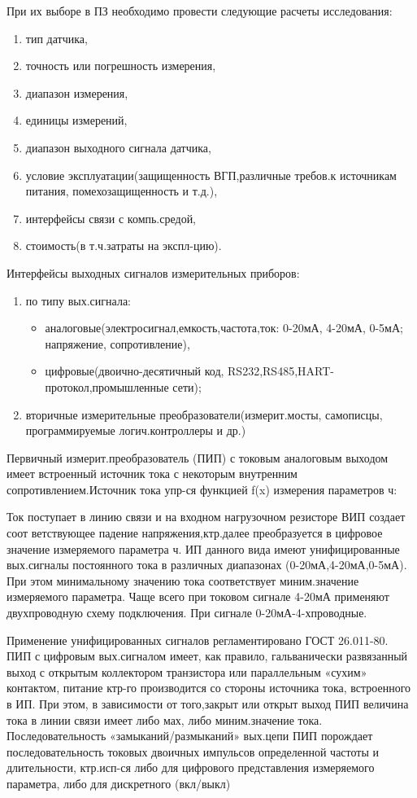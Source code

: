 \documentclass[unicode, 12pt, a4paper, oneside]{article}
\begin{document}
При их выборе в ПЗ необходимо провести следующие расчеты исследования:
\begin{enumerate}
\item тип датчика,
\item точность или погрешность измерения,
\item диапазон измерения,
\item единицы измерений,
\item диапазон выходного сигнала датчика,
\item условие эксплуатации(защищенность ВГП,различные требов.к источникам питания, помехозащищенность и т.д.), 
\item интерфейсы связи с компь.средой,
\item стоимость(в т.ч.затраты на экспл-цию).
\end{enumerate}
Интерфейсы выходных сигналов измерительных приборов:
\begin{enumerate}
 \item по типу вых.сигнала:
 \begin{itemize}
 \item аналоговые(электросигнал,емкость,частота,ток: 0-20мА, 4-20мА, 0-5мА; напряжение, сопротивление),
 \item цифровые(двоично-десятичный код, RS232,RS485,HART-протокол,промышленные сети);
 \end{itemize}
\item вторичные измерительные преобразователи(измерит.мосты, самописцы, программируемые логич.контроллеры и др.)
\end{enumerate}
Первичный измерит.преобразователь (ПИП) с токовым аналоговым выходом имеет встроенный источник тока с некоторым внутренним сопротивлением.Источник тока упр-ся функцией f(x) измерения параметров ч:

Ток поступает в линию связи и на входном нагрузочном резисторе ВИП создает соот ветствующее падение напряжения,ктр.далее преобразуется в цифровое значение измеряемого параметра ч. ИП данного вида имеют унифицированные вых.сигналы постоянного тока в различных диапазонах (0-20мА,4-20мА,0-5мА). При этом минимальному значению тока соответствует миним.значение измеряемого параметра. Чаще всего при токовом сигнале 4-20мА применяют двухпроводную схему подключения. При сигнале 0-20мА-4-хпроводные.

Применение унифицированных сигналов регламентировано ГОСТ 26.011-80. ПИП с цифровым вых.сигналом имеет, как правило, гальванически развязанный выход с открытым коллектором транзистора или параллельным «сухим» контактом, питание ктр-го производится со стороны источника тока, встроенного в ИП. При этом, в зависимости от того,закрыт или открыт выход ПИП величина тока в линии связи имеет либо мах, либо миним.значение тока. Последовательность «замыканий/размыканий» вых.цепи ПИП порождает последовательность токовых двоичных импульсов определенной частоты и длительности, ктр.исп-ся либо для цифрового представления измеряемого параметра, либо для дискретного (вкл/выкл)
\end{document}
